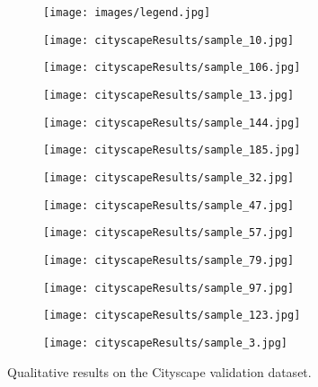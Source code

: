 \documentclass[runningheads]{llncs}
\begin{document}
\begin{figure}[t!]
\begin{subfigure}[b]{\columnwidth}
\texttt{[image: images/legend.jpg]}
\end{subfigure}
\begin{subfigure}[b]{\columnwidth}
\texttt{[image: cityscapeResults/sample\_10.jpg]}
\end{subfigure}
\begin{subfigure}[b]{\columnwidth}
\texttt{[image: cityscapeResults/sample\_106.jpg]}
\end{subfigure}
\begin{subfigure}[b]{\columnwidth}
\texttt{[image: cityscapeResults/sample\_13.jpg]}
\end{subfigure}
\begin{subfigure}[b]{\columnwidth}
\texttt{[image: cityscapeResults/sample\_144.jpg]}
\end{subfigure}
\begin{subfigure}[b]{\columnwidth}
\texttt{[image: cityscapeResults/sample\_185.jpg]}
\end{subfigure}
\begin{subfigure}[b]{\columnwidth}
\texttt{[image: cityscapeResults/sample\_32.jpg]}
\end{subfigure}
\begin{subfigure}[b]{\columnwidth}
\texttt{[image: cityscapeResults/sample\_47.jpg]}
\end{subfigure}
\begin{subfigure}[b]{\columnwidth}
\texttt{[image: cityscapeResults/sample\_57.jpg]}
\end{subfigure}
\begin{subfigure}[b]{\columnwidth}
\texttt{[image: cityscapeResults/sample\_79.jpg]}
\end{subfigure}
\begin{subfigure}[b]{\columnwidth}
\texttt{[image: cityscapeResults/sample\_97.jpg]}
\end{subfigure}
\begin{subfigure}[b]{\columnwidth}
\texttt{[image: cityscapeResults/sample\_123.jpg]}
\end{subfigure}
\begin{subfigure}[b]{\columnwidth}
\texttt{[image: cityscapeResults/sample\_3.jpg]}
\end{subfigure}
\caption{Qualitative results on the Cityscape validation dataset.}
\label{fig:cityResultsSupp}
\end{figure}
\end{document}
